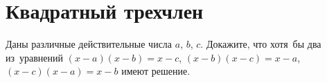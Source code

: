 
\section*{Квадратный трехчлен}


\begin{problems}





\item
Даны различные действительные числа $a$, $b$, $c$.
Докажите, что хотя~бы два из~уравнений
$(x - a) (x - b) = x - c$, $(x - b) (x - c) = x - a$, $(x - c) (x - a) = x - b$
имеют решение.



\end{problems}
